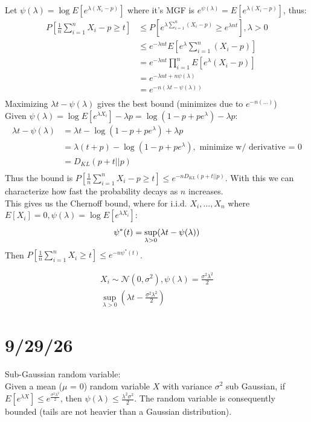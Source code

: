 \documentclass[11pt,a4paper,margin=1in]{article}
\begin{document}
Let $\psi(\lambda) = \log E[e^{\lambda(X_i - p)}]$ where it's MGF is $e^{\psi(\lambda)} = E[e^{\lambda(X_i - p)}]$, thus:
\begin{align*}
    P[\frac{1}{n}\sum_{i=1}^{n}X_i - p \geq t] &\leq P[e^{\lambda\sum_{i=1}^{n}(X_i - p)} \geq e^{\lambda nt}], \lambda > 0 \\
    &\leq e^{-\lambda nt}E[e^\lambda\sum_{i=1}^{n}(X_i - p)] \\
    &= e^{-\lambda nt}\prod_{i=1}^{n}E[e^\lambda(X_i - p)] \\
    &= e^{-\lambda nt + n\psi(\lambda)} \\
    &= e^{-n(\lambda t - \psi(\lambda))} \\
\end{align*}
Maximizing $\lambda t - \psi(\lambda)$ gives the best bound (minimizes due to $e^{-n(\dots)}$) \\
Given $\psi(\lambda) = \log E[e^{\lambda X_i}] - \lambda p = \log(1 - p + pe^\lambda) - \lambda p$:
\begin{align*}
    \lambda t - \psi(\lambda) &= \lambda t - \log(1 - p + pe^\lambda) + \lambda p \\
    &= \lambda(t + p) - \log(1 - p + pe^\lambda), \text{ minimize w/ derivative = 0}\\
    &= D_{KL}(p + t || p) \\
\end{align*}
Thus the bound is $P[\frac{1}{n}\sum_{i=1}^{n}X_i - p \geq t] \leq e^{-nD_{KL}(p + t || p)}$.
With this we can characterize how fast the probability decays as $n$ increases. \\

\noindent This gives us the Chernoff bound, where for i.i.d. $X_i, \dots, X_n$ where
$E[X_i] = 0, \psi(\lambda) = \log E[e^{\lambda X_i}]$:
\[
    \psi^*(t) = \sup_{\lambda > 0}(\lambda t - \psi(\lambda)) \\
\]
Then $P[\frac{1}{n}\sum_{i=1}^{n}X_i \geq t] \leq e^{-n\psi^*(t)}$.

\begin{gather*}
    X_i \sim \mathcal{N}(0, \sigma^2), \psi(\lambda) = \frac{\sigma^2\lambda^2}{2} \\
    \sup_{\lambda > 0} (\lambda t - \frac{\sigma^2\lambda^2}{2})
\end{gather*}

\section*{9/29/26}
Sub-Gaussian random variable: \\
Given a mean ($\mu$ = 0) random variable $X$ with variance $\sigma^2$ sub Gaussian,
if $E[e^{\lambda X}] \leq e^{\frac{\sigma^2\lambda^2}{2}}$, then 
$\psi(\lambda) \leq \frac{\lambda^2\sigma^2}{2}$. The random variable is consequently
bounded (tails are not heavier than a Gaussian distribution).
\end{document}
